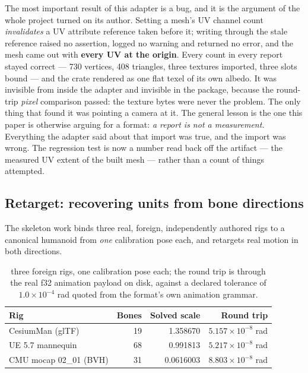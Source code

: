 \documentclass[10pt,twocolumn,letterpaper]{article}
\begin{document}
The most important result of this adapter is a bug, and it is the argument of the whole project turned on its author. Setting a mesh's UV channel count \emph{invalidates} a UV attribute reference taken before it; writing through the stale reference raised no assertion, logged no warning and returned no error, and the mesh came out with \textbf{every UV at the origin}. Every count in every report stayed correct --- 730 vertices, 408 triangles, three textures imported, three slots bound --- and the crate rendered as one flat texel of its own albedo. It was invisible from inside the adapter and invisible in the package, because the round-trip \emph{pixel} comparison passed: the texture bytes were never the problem. The only thing that found it was pointing a camera at it. The general lesson is the one this paper is otherwise arguing for a format: \emph{a report is not a measurement.} Everything the adapter said about that import was true, and the import was wrong. The regression test is now a number read back off the artifact --- the measured UV extent of the built mesh --- rather than a count of things attempted.

\subsection{Retarget: recovering units from bone directions}

The skeleton work binds three real, foreign, independently authored rigs to a canonical humanoid from \emph{one} calibration pose each, and retargets real motion in both directions.

\begin{table}[t]\centering\footnotesize
\caption{three foreign rigs, one calibration pose each; the round trip is through the real f32 animation payload on disk, against a declared tolerance of $1.0\times10^{-4}$ rad quoted from the format's own animation grammar.}
\begin{tabular}{@{}L{2.7cm} r r r@{}}
\toprule
Rig & Bones & Solved scale & Round trip \\
\midrule
CesiumMan (glTF) & 19 & 1.358670 & $5.157\times10^{-8}$ rad \\
UE 5.7 mannequin & 68 & 0.991813 & $5.217\times10^{-8}$ rad \\
CMU mocap 02\_01 (BVH) & 31 & 0.0616003 & $8.803\times10^{-8}$ rad \\
\bottomrule
\end{tabular}
\end{table}
\end{document}
